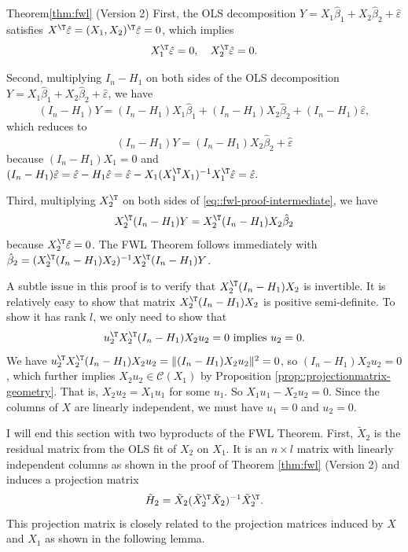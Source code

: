 \begin{myproof}{Theorem}{\ref{thm:fwl}} (Version 2)
First, the OLS decomposition $Y =X_{1}\hat{\beta}_{1}+X_{2}\hat{\beta}_{2}+\hat{\varepsilon}$
satisfies $X^{\T}\hat{\varepsilon}= (X_1, X_2)^{\T}\hat{\varepsilon} =  0$, which implies 
$$ 
X_{1}^{\T}\hat{\varepsilon}=0,
\quad 
X_{2}^{\T}\hat{\varepsilon}=0.
$$

Second, multiplying $I_{n}-H_{1}$ on both sides of the OLS decomposition $Y =X_{1}\hat{\beta}_{1}+X_{2}\hat{\beta}_{2}+\hat{\varepsilon}$,
we have
\[
(I_{n}-H_{1}) Y =(I_{n}-H_{1})X_{1}  \hat{\beta}_1 +(I_{n}-H_{1})X_{2} \hat{\beta}_2 +(I_{n}-H_{1})\hat{\varepsilon},
\]
which reduces to 
\begin{equation}\label{eq::fwl-proof-intermediate}
(I_{n}-H_{1})Y=(I_{n}-H_{1})X_{2}\hat{\beta}_{2}+\hat{\varepsilon}
\end{equation}
because $(I_{n}-H_{1})X_{1}=0$ and 
$
(I_{n}-H_{1})\hat{\varepsilon}=\hat{\varepsilon}-H_{1}\hat{\varepsilon}=\hat{\varepsilon}-X_{1}(X_{1}^{\T}X_{1})^{-1}X_{1}^{\T}\hat{\varepsilon}=\hat{\varepsilon}.
$

Third, multiplying $X_2^{\T}$ on both sides of \eqref{eq::fwl-proof-intermediate}, we have
$$
X_2^{\T}(I_{n}-H_{1})Y = X_2^{\T}(I_{n}-H_{1})X_{2} \hat{\beta}_{2}
$$
because $X_{2}^{\T}\hat{\varepsilon}=0$. 
The FWL Theorem follows immediately with $\hat{\beta}_{2} = (X_2^{\T}(I_{n}-H_{1})X_{2})^{-1} X_2^{\T}(I_{n}-H_{1})Y$. 

A subtle issue in this proof is to verify that $X_{2}^{\T}(I_{n}-H_{1})X_{2}$ is invertible. It is relatively easy to show that matrix $X_{2}^{\T}(I_{n}-H_{1})X_{2}$ is positive semi-definite. To show it has rank $l$, we only need to show that 
$$
u_{2}^{\T}X_{2}^{\T}(I_{n}-H_{1})X_{2}u_{2}  =0 \text{ implies } u_2 = 0.
$$
We have $u_{2}^{\T}X_{2}^{\T}(I_{n}-H_{1})X_{2}u_{2}   = \|(I_{n}-H_{1})X_{2}u_{2} \|^2=0$, so $(I_{n}-H_{1})X_{2}u_{2} = 0$, which further implies $X_{2}u_{2}\in\mathcal{C}(X_{1})$ by Proposition \ref{prop::projectionmatrix-geometry}. That is, $ X_{2}u_{2} = X_1 u_1$ for some $u_1$. So $X_1 u_1 - X_2 u_2 = 0$. Since the columns of $X$ are linearly independent, we must have $u_1 = 0$ and $u_2 = 0$. 
\end{myproof}

 
 
 


I will end this section with two byproducts of the FWL Theorem. First, $\tilde{X}_{2}$ is the residual matrix from the OLS fit of $X_2$ on $X_1$. It is an $n\times l$ matrix with linearly independent columns as shown in the proof of Theorem \ref{thm:fwl} (Version 2)  and induces a projection matrix
$$
\tilde{H}_2 = \tilde{X}_{2} (\tilde{X}_{2}^{\T} \tilde{X}_{2})^{-1} \tilde{X}_{2}^{\T}. 
$$
This projection matrix is closely related to the projection matrices induced by $X$ and $X_1$ as shown in the following lemma. 

